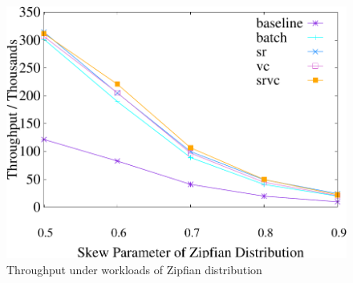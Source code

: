 \begin{figure}[t]
	\begin{minipage}[b]{0.31\linewidth}
	\centering
	\includegraphics[width=\textwidth]{./exp_fig/basic/tps}
	\vspace{-2em}
	\caption{Throughput under workloads of Zipfian distribution}
	\label{fig:basic:tps}
	\end{minipage}    
\end{figure}

